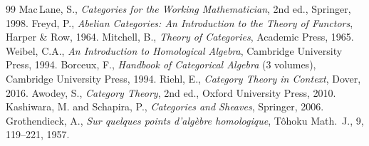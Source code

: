 \documentclass[a4paper,12pt]{book}
\begin{document}


\begin{thebibliography}{99}
 Mac\,Lane, S., \emph{Categories for the Working Mathematician}, 2nd ed., Springer, 1998.
 Freyd, P., \emph{Abelian Categories: An Introduction to the Theory of Functors}, Harper \& Row, 1964.
 Mitchell, B., \emph{Theory of Categories}, Academic Press, 1965.
 Weibel, C.A., \emph{An Introduction to Homological Algebra}, Cambridge University Press, 1994.
 Borceux, F., \emph{Handbook of Categorical Algebra} (3 volumes), Cambridge University Press, 1994.
 Riehl, E., \emph{Category Theory in Context}, Dover, 2016.
 Awodey, S., \emph{Category Theory}, 2nd ed., Oxford University Press, 2010.
 Kashiwara, M. and Schapira, P., \emph{Categories and Sheaves}, Springer, 2006.
 Grothendieck, A., \emph{Sur quelques points d'alg\`ebre homologique}, T\^ohoku Math.\ J., 9, 119--221, 1957.
\end{thebibliography}


\printindex
\end{document}
